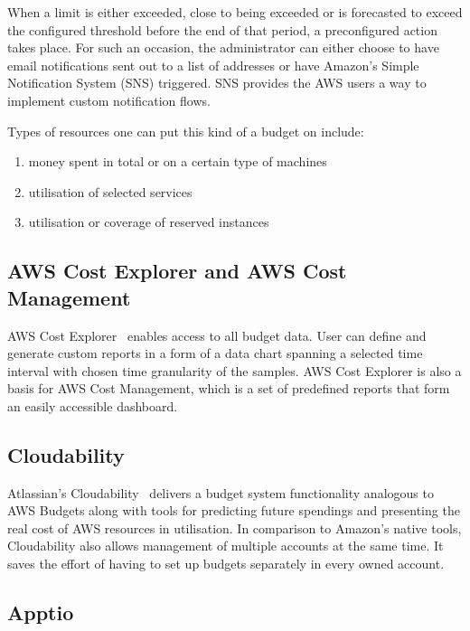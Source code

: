 \documentclass[licencjacka,en]{thesisclass}
\begin{document}
    When a limit is either exceeded, close to being exceeded or is forecasted
    to exceed the configured threshold before the end of that period,
    a preconfigured action takes place.
    For such an occasion, the administrator can either choose
    to have email notifications sent out to a list of addresses
    or have Amazon's Simple Notification System (SNS) triggered.
    SNS provides the AWS users a way to implement custom notification flows.

    Types of resources one can put this kind of a budget on include:

    \begin{enumerate}
        \item money spent in total or on a certain type of machines
        \item utilisation of selected services
        \item utilisation or coverage of reserved instances
    \end{enumerate}

    \subsection{AWS Cost Explorer and AWS Cost Management}

    AWS Cost Explorer~\cite{CostExplorer} enables access to all budget data.
    User can define and generate custom reports in a form
    of a data chart spanning a selected time interval
    with chosen time granularity of the samples.
    AWS Cost Explorer is also a basis for AWS Cost Management,
    which is a set of predefined reports
    that form an easily accessible dashboard.

    \subsection{Cloudability}

    Atlassian's Cloudability~\cite{Cloudability} delivers
    a budget system functionality analogous to AWS Budgets
    along with tools for predicting future spendings
    and presenting the real cost of AWS resources in utilisation.
    In comparison to Amazon's native tools, Cloudability
    also allows management of multiple accounts at the same time.
    It saves the effort of having to set up budgets separately in every owned account.

    \subsection{Apptio}
\end{document}
